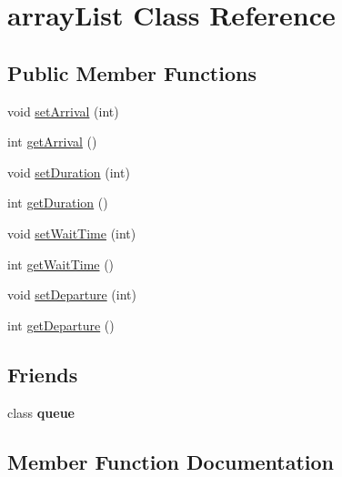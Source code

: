 \hypertarget{classarray_list}{}\section{array\+List Class Reference}
\label{classarray_list}
\subsection*{Public Member Functions}
\begin{DoxyCompactItemize}
\item 
void \mbox{\hyperlink{classarray_list_a0270346185db9f1a7e8adf3ab5bc34df}{set\+Arrival}} (int)
\item 
int \mbox{\hyperlink{classarray_list_a70baf2e4a78ae3e63abead90291da66e}{get\+Arrival}} ()
\item 
void \mbox{\hyperlink{classarray_list_a69206417ce98eba086eace8d359b9fbf}{set\+Duration}} (int)
\item 
int \mbox{\hyperlink{classarray_list_a52d99fb592985f14e4638380d1570bd1}{get\+Duration}} ()
\item 
void \mbox{\hyperlink{classarray_list_a4aaec98923f47fac43cceddb4de0bf64}{set\+Wait\+Time}} (int)
\item 
int \mbox{\hyperlink{classarray_list_a5351c85d664c32c1d7545c25076e3e5e}{get\+Wait\+Time}} ()
\item 
void \mbox{\hyperlink{classarray_list_a9a8eeffa3c8e0ca873bead0477ac48e7}{set\+Departure}} (int)
\item 
int \mbox{\hyperlink{classarray_list_ac0bb8425cf62f6b0c0d934a896ffbdf7}{get\+Departure}} ()
\end{DoxyCompactItemize}
\subsection*{Friends}
\begin{DoxyCompactItemize}
\item 
\mbox{\label{classarray_list_ab0867b3d911833209f691474b8b2c37b}} 
class {\bfseries queue}
\end{DoxyCompactItemize}


\subsection{Member Function Documentation}
\mbox{\label{classarray_list_a70baf2e4a78ae3e63abead90291da66e}} 
